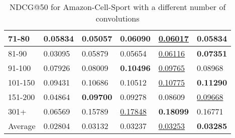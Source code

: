 \begin{table*}[]
\begin{tabular}{|l|l|l|l|l|l|}
        71-80   & 0.05834                    & 0.05057                    & \textbf{0.06090}           & \underline{0.06017}        & 0.05834                    \\ \hline
        81-90   & 0.03095                    & 0.05879                    & 0.05654                    & \underline{0.06116}        & \textbf{0.07351}           \\ \hline
        91-100  & 0.07926                    & 0.08009                    & \textbf{0.10496}           & \underline{0.09765}        & 0.08968                    \\ \hline
        101-150 & 0.09431                    & 0.10686                    & 0.10512                    & \underline{0.10775}        & \textbf{0.11290}           \\ \hline
        151-200 & 0.04864                    & \textbf{0.09700}           & 0.09278                    & 0.08609                    & \underline{0.09668}        \\ \hline
        301+    & 0.06569                    & 0.15789                    & \underline{0.17848}        & \textbf{0.18099}           & 0.16771                    \\ \hline
        Average & 0.02804                    & 0.03132                    & 0.03237                    & \underline{0.03253}        & \textbf{0.03285}           \\ \hline
    \end{tabular}
    \caption{NDCG@50 for Amazon-Cell-Sport with a different number of convolutions}
    \centering
    \label{tab:Amazon-cell-sport-con-evaluation}
\end{table*}

